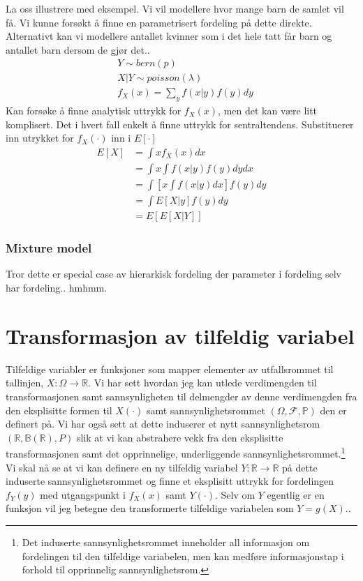 La oss illustrere med eksempel. Vi vil modellere hvor mange barn de samlet vil få. Vi kunne forsøkt å finne en parametrisert fordeling på dette direkte. Alternativt kan vi modellere antallet kvinner som i det hele tatt får barn og antallet barn dersom de gjør det..
\begin{align}
&Y \sim bern(p)\\
& X|Y \sim poisson(\lambda) \\
& f_X(x) = \sum_y f(x|y)f(y)dy
\end{align}
Kan forsøke å finne analytisk uttrykk for $f_X(x)$, men det kan være litt komplisert. Det i hvert fall enkelt å finne uttrykk for sentraltendens. Substituerer inn utrykket for $f_X(\cdot)$ inn i $E[\cdot]$
\begin{align}
E[X]&=\int x f_X(x)dx \\
&= \int x \int f(x|y)f(y)dy dx \\
&= \int\left[x \int f(x|y)dx\right]f(y)dy \\
&= \int E[X|y]f(y)dy \\
&= E[E[X|Y]]
\end{align} 
\subsubsection{Mixture model}
Tror dette er special case av hierarkisk fordeling der parameter i fordeling selv har fordeling.. hmhmm.
\section{Transformasjon av tilfeldig variabel}
Tilfeldige variabler er funksjoner som mapper elementer av utfallsrommet til tallinjen, $X:\Omega \to \mathbb{R}$. Vi har sett hvordan jeg kan utlede verdimengden til transformasjonen samt sannsynligheten til delmengder av denne verdimengden fra den eksplisitte formen til $X(\cdot)$ samt sannsynlighetsrommet $(\Omega, \mathscr{F}, \mathbb{P})$ den er definert på. Vi har også sett at dette induserer et nytt sannsynlighetsrom $(\mathbb{R}, \mathbb{B}(\mathbb{R}), P)$ slik at vi kan abstrahere vekk fra den eksplisitte transformasjonen samt det opprinnelige, underliggende sannsynlighetsrommet.\footnote{Det induserte sannsynlighetsrommet inneholder all informasjon om fordelingen til den tilfeldige variabelen, men kan medføre informasjonstap i forhold til opprinnelig sannsynlighetsrom.} Vi skal nå se at vi kan definere en ny tilfeldig variabel $Y:\mathbb{R}\to\mathbb{R}$ på dette induserte sannsynlighetsrommet og finne et eksplisitt uttrykk for fordelingen $f_Y(y)$ med utgangspunkt i $f_X(x)$ samt $Y(\cdot)$. Selv om $Y$ egentlig er en funksjon vil jeg betegne den transformerte tilfeldige variabelen som $Y=g(X)$..
